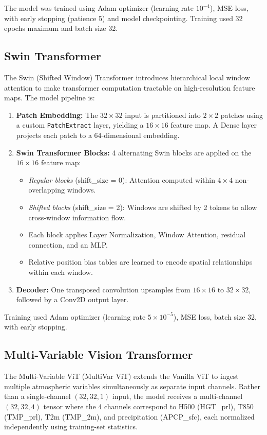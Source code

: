 \documentclass[12pt,a4paper,oneside]{report}
\begin{document}
The model was trained using Adam optimizer (learning rate $10^{-4}$), MSE loss, with early stopping (patience 5) and model checkpointing. Training used 32 epochs maximum and batch size 32.

\subsection{Swin Transformer}

The Swin (Shifted Window) Transformer introduces hierarchical local window attention to make transformer computation tractable on high-resolution feature maps. The model pipeline is:

\begin{enumerate}
    \item \textbf{Patch Embedding:} The $32\times32$ input is partitioned into $2\times2$ patches using a custom \texttt{PatchExtract} layer, yielding a $16\times16$ feature map. A Dense layer projects each patch to a 64-dimensional embedding.
    \item \textbf{Swin Transformer Blocks:} 4 alternating Swin blocks are applied on the $16\times16$ feature map:
    \begin{itemize}
        \item \textit{Regular blocks} (shift\_size = 0): Attention computed within $4\times4$ non-overlapping windows.
        \item \textit{Shifted blocks} (shift\_size = 2): Windows are shifted by 2 tokens to allow cross-window information flow.
        \item Each block applies Layer Normalization, Window Attention, residual connection, and an MLP.
        \item Relative position bias tables are learned to encode spatial relationships within each window.
    \end{itemize}
    \item \textbf{Decoder:} One transposed convolution upsamples from $16\times16$ to $32\times32$, followed by a Conv2D output layer.
\end{enumerate}

Training used Adam optimizer (learning rate $5 \times 10^{-5}$), MSE loss, batch size 32, with early stopping.

\subsection{Multi-Variable Vision Transformer}

The Multi-Variable ViT (MultiVar ViT) extends the Vanilla ViT to ingest multiple atmospheric variables simultaneously as separate input channels. Rather than a single-channel $(32, 32, 1)$ input, the model receives a multi-channel $(32, 32, 4)$ tensor where the 4 channels correspond to H500 (HGT\_prl), T850 (TMP\_prl), T2m (TMP\_2m), and precipitation (APCP\_sfc), each normalized independently using training-set statistics.
\end{document}
